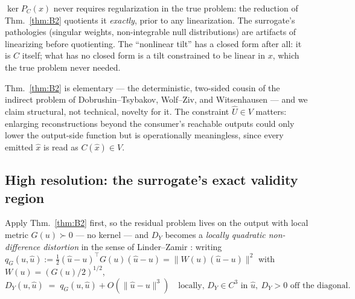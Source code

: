 \begin{corollary}
\label{cor:B2b}
$\ker P_C(x)$ never requires regularization in the true problem: the reduction
of Thm.~\ref{thm:B2} quotients it \emph{exactly}, prior to any linearization.
The surrogate's pathologies (singular weights, non-integrable null
distributions) are artifacts of linearizing before quotienting. The
``nonlinear tilt'' has a closed form after all: it is $C$ itself; what has no
closed form is a tilt constrained to be linear in $x$, which the true problem
never needed.
\end{corollary}

\begin{remark}
Thm.~\ref{thm:B2} is elementary --- the deterministic, two-sided cousin of the
indirect problem of Dobrushin--Tsybakov, Wolf--Ziv, and Witsenhausen --- and we
claim structural, not technical, novelty for it. The constraint $\hat U\in V$
matters: enlarging reconstructions beyond the consumer's reachable outputs
could only lower the output-side function but is operationally meaningless,
since every emitted $\hat x$ is read as $C(\hat x)\in V$.
\end{remark}

\subsection{High resolution: the surrogate's exact validity region}

Apply Thm.~\ref{thm:B2} first, so the residual problem lives on the output with
local metric $G(u)\succ 0$ --- no kernel --- and $D_Y$ becomes a
\emph{locally quadratic non-difference distortion} in the sense of
Linder--Zamir \cite{LinderZamir99}: writing
$q_G(u,\hat u):=\tfrac12(\hat u-u)^{\!\top} G(u)(\hat u-u)
=\|W(u)(\hat u-u)\|^2$ with $W(u)=(G(u)/2)^{1/2}$,
\[
D_Y(u,\hat u)\;=\;q_G(u,\hat u)+O(\|\hat u-u\|^{3})
\quad\text{locally, } D_Y\in C^{3}\text{ in }\hat u,\ D_Y>0\text{ off the diagonal.}
\]

